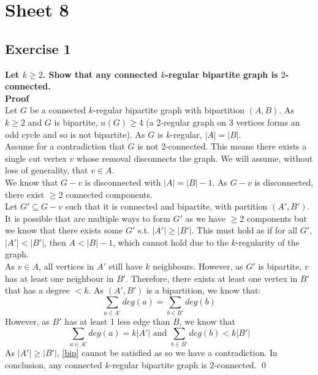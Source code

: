 \section*{Sheet 8}
\subsection*{Exercise 1}
\boldmath
\textbf{Let $k \geq 2$. Show that any connected $k$-regular bipartite graph is $2$-connected.\\\linebreak Proof\\}
\unboldmath
Let $G$ be a connected $k$-regular bipartite graph with bipartition $(A, B)$. As $k \geq 2$ and $G$ is bipartite, $n(G) \geq 4$ (a 2-regular graph on 3 vertices forms an odd cycle and so is not bipartite). As $G$ is $k$-regular, $|A| = |B|$. \\
\linebreak 
Assume for a contradiction that $G$ is not 2-connected. This means there exists a single cut vertex $v$ whose removal disconnects the graph. We will assume, without loss of generality, that $v \in A$. \\
\linebreak 
We know that $G-v$ is disconnected with $|A| = |B|-1$. As $G-v$ is disconnected, there exist $\geq 2$ connected components. \\
\linebreak 
Let $G' \subseteq G-v$ such that it is connected and bipartite, with partition $(A', B')$. It is possible that are multiple ways to form $G'$ as we have $\geq 2$ components but we know that there exists some $G'$ s.t. $|A'| \geq |B'|$. This must hold as if for all $G'$, $|A'| < |B'|$, then $A < |B| - 1$, which cannot hold due to the $k$-regularity of the graph. \\
\linebreak 
As $v \in A$, all vertices in $A'$ still have $k$ neighbours. However, as $G'$ is bipartite, $v$ has at least one neighbour in $B'$. Therefore, there exists at least one vertex in $B'$ that has a degree $ < k$. As $(A', B')$ is a bipartition, we know that: 
\begin{equation}
    \sum_{a \in A'} deg(a) = \sum_{b \in B'} deg(b)
    \label{bip}
\end{equation}
However, as $B'$ has at least 1 less edge than $B$, we know that
\begin{equation}
    \sum_{a \in A'} deg(a) = k|A'| \text{  and  } \sum_{b \in B'} deg(b) < k|B'|
\end{equation}
As $|A'| \geq |B'|$, \ref{bip} cannot be satisfied as so we have a contradiction. In conclusion, any connected $k$-regular bipartite graph is 2-connected. \qed